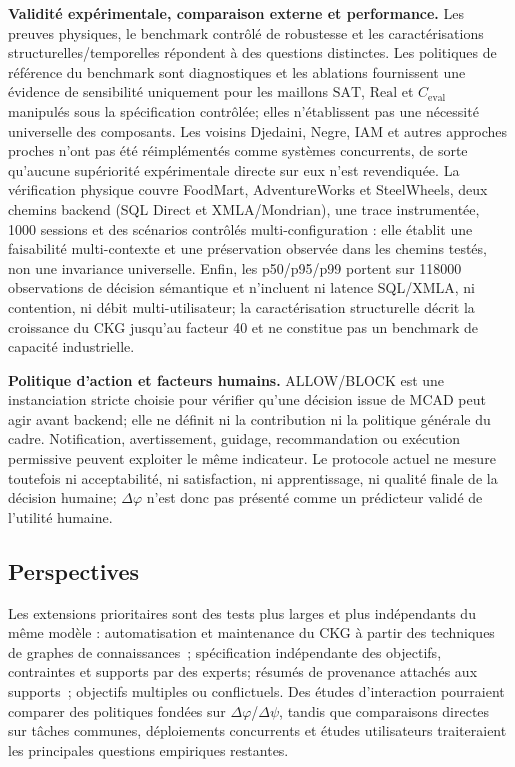 \documentclass[journal]{IEEEtran}
\begin{document}
\textbf{Validité expérimentale, comparaison externe et performance.} Les preuves physiques, le benchmark contrôlé de robustesse et les caractérisations structurelles/temporelles répondent à des questions distinctes. Les politiques de référence du benchmark sont diagnostiques et les ablations fournissent une évidence de sensibilité uniquement pour les maillons $\mathrm{SAT}$, $\mathrm{Real}$ et $C_{\mathrm{eval}}$ manipulés sous la spécification contrôlée; elles n'établissent pas une nécessité universelle des composants. Les voisins Djedaini, Negre, IAM et autres approches proches n'ont pas été réimplémentés comme systèmes concurrents, de sorte qu'aucune supériorité expérimentale directe sur eux n'est revendiquée. La vérification physique couvre FoodMart, AdventureWorks et SteelWheels, deux chemins backend (SQL Direct et XMLA/Mondrian), une trace instrumentée, 1000 sessions et des scénarios contrôlés multi-configuration : elle établit une faisabilité multi-contexte et une préservation observée dans les chemins testés, non une invariance universelle. Enfin, les p50/p95/p99 portent sur 118000 observations de décision sémantique et n'incluent ni latence SQL/XMLA, ni contention, ni débit multi-utilisateur; la caractérisation structurelle décrit la croissance du CKG jusqu'au facteur 40 et ne constitue pas un benchmark de capacité industrielle.

\textbf{Politique d'action et facteurs humains.} ALLOW/BLOCK est une instanciation stricte choisie pour vérifier qu'une décision issue de MCAD peut agir avant backend; elle ne définit ni la contribution ni la politique générale du cadre. Notification, avertissement, guidage, recommandation ou exécution permissive peuvent exploiter le même indicateur. Le protocole actuel ne mesure toutefois ni acceptabilité, ni satisfaction, ni apprentissage, ni qualité finale de la décision humaine; $\Delta\varphi$ n'est donc pas présenté comme un prédicteur validé de l'utilité humaine.

\subsection{Perspectives}

Les extensions prioritaires sont des tests plus larges et plus indépendants du même modèle : automatisation et maintenance du CKG à partir des techniques de graphes de connaissances~\cite{ZhongKGC2024}; spécification indépendante des objectifs, contraintes et supports par des experts; résumés de provenance attachés aux supports~\cite{AlOmeirLaiMilaniPottinger2023}; objectifs multiples ou conflictuels. Des études d'interaction pourraient comparer des politiques fondées sur $\Delta\varphi$/$\Delta\psi$, tandis que comparaisons directes sur tâches communes, déploiements concurrents et études utilisateurs traiteraient les principales questions empiriques restantes.
\end{document}
